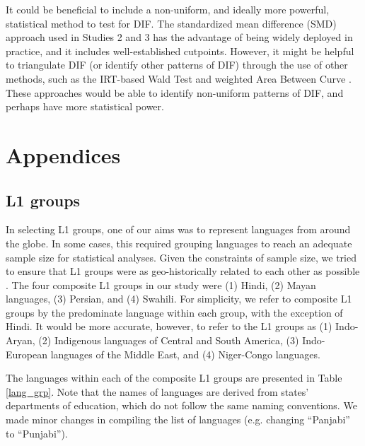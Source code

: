 \documentclass [PhD] {uclathes}
\begin{document}
It could be beneficial to include a non-uniform, and ideally more powerful, statistical method to test for DIF. The standardized mean difference (SMD) approach used in Studies 2 and 3 has the advantage of being widely deployed in practice, and it includes well-established cutpoints. However, it might be helpful to triangulate DIF (or identify other patterns of DIF) through the use of other methods, such as the IRT-based Wald Test \citep{woods2013} and weighted Area Between Curve \citep{hansen2014methodology}. These approaches would be able to identify non-uniform patterns of DIF, and perhaps have more statistical power. 



\chapter{Appendices}

\section{L1 groups}
\label{sec:appendix_lang}

In selecting L1 groups, one of our aims was to represent languages from around the globe. In some cases, this required grouping languages to reach an adequate sample size for statistical analyses. Given the constraints of sample size, we tried to ensure that L1 groups were as geo-historically related to each other as possible \citep{brown2005encyclopedia}. The four composite L1 groups in our study were (1) Hindi, (2) Mayan languages, (3) Persian, and (4) Swahili. For simplicity, we refer to composite L1 groups by the predominate language within each group, with the exception of Hindi. It would be more accurate, however, to refer to the L1 groups as (1) Indo-Aryan, (2) Indigenous languages of Central and South America, (3) Indo-European languages of the Middle East, and (4) Niger-Congo languages. 

The languages within each of the composite L1 groups are presented in Table \ref{lang_grp}. Note that the names of languages are derived from states’ departments of education, which do not follow the same naming conventions. We made minor changes in compiling the list of languages (e.g. changing “Panjabi” to “Punjabi”). 
\end{document}
